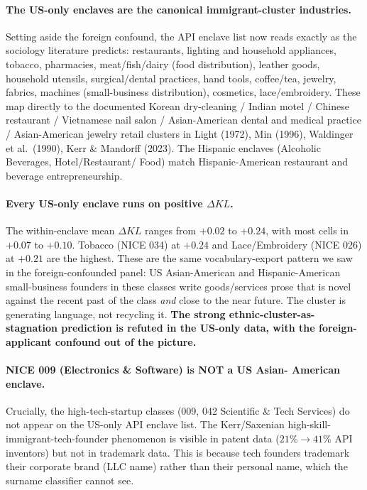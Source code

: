 \documentclass[11pt]{article}
\begin{document}
\paragraph{The US-only enclaves are the canonical
immigrant-cluster industries.} Setting aside the foreign confound,
the API enclave list now reads exactly as the sociology literature
predicts: restaurants, lighting and household appliances, tobacco,
pharmacies, meat/fish/dairy (food distribution), leather goods,
household utensils, surgical/dental practices, hand tools,
coffee/tea, jewelry, fabrics, machines (small-business
distribution), cosmetics, lace/embroidery. These map directly to
the documented Korean dry-cleaning / Indian motel / Chinese
restaurant / Vietnamese nail salon / Asian-American dental and
medical practice / Asian-American jewelry retail clusters in Light
(1972), Min (1996), Waldinger et al.\ (1990), Kerr \& Mandorff
(2023). The Hispanic enclaves (Alcoholic Beverages, Hotel/Restaurant/
Food) match Hispanic-American restaurant and beverage
entrepreneurship.

\paragraph{Every US-only enclave runs on positive $\Delta KL$.}
The within-enclave mean $\Delta KL$ ranges from $+0.02$ to $+0.24$,
with most cells in $+0.07$ to $+0.10$. Tobacco (NICE 034) at $+0.24$
and Lace/Embroidery (NICE 026) at $+0.21$ are the highest. These
are the same vocabulary-export pattern we saw in the
foreign-confounded panel: US Asian-American and Hispanic-American
small-business founders in these classes write goods/services
prose that is novel against the recent past of the class
\emph{and} close to the near future. The cluster is generating
language, not recycling it. \textbf{The strong ethnic-cluster-as-
stagnation prediction is refuted in the US-only data, with the
foreign-applicant confound out of the picture.}

\paragraph{NICE 009 (Electronics \& Software) is NOT a US Asian-
American enclave.} Crucially, the high-tech-startup classes (009,
042 Scientific \& Tech Services) do not appear on the US-only API
enclave list. The Kerr/Saxenian high-skill-immigrant-tech-founder
phenomenon is visible in patent data ($21\%\to 41\%$ API inventors)
but not in trademark data. This is because tech founders trademark
their corporate brand (LLC name) rather than their personal name,
which the surname classifier cannot see.
\end{document}
